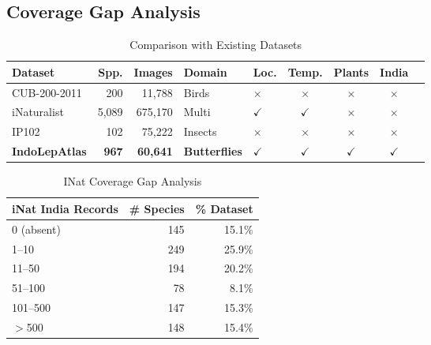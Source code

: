 \documentclass[runningheads]{llncs}
\begin{document}
\subsection{Coverage Gap Analysis}
\begin{table}[H]
\centering
\caption{Comparison with Existing Datasets}
\label{tab:dataset_comparison}
\scriptsize
\begin{tabular}{@{}lrrllcccc@{}}
    \toprule
        \textbf{Dataset} & \textbf{Spp.} & \textbf{Images} & \textbf{Domain} & \textbf{Loc.} & \textbf{Temp.} & \textbf{Plants} & \textbf{India} \\
    \midrule
        CUB-200-2011 & 200 & 11,788 & Birds & $\times$ & $\times$ & $\times$ & $\times$ \\
        iNaturalist & 5,089 & 675,170 & Multi & $\checkmark$ & $\checkmark$ & $\times$ & $\times$ \\
        IP102~\cite{wu2019ip102} & 102 & 75,222 & Insects & $\times$ & $\times$ & $\times$ & $\times$ \\
        \textbf{IndoLepAtlas} & \textbf{967} & \textbf{60,641} & \textbf{Butterflies} & $\checkmark$ & $\checkmark$ & $\checkmark$ & $\checkmark$ \\
    \bottomrule
    \end{tabular}
\end{table}
\begin{table}[H]
\centering
    \caption{INat Coverage Gap Analysis}
    \label{tab:inat_coverage}
    \begin{tabular}{@{}lrr@{}}
        \toprule
        iNat India Records & \# Species & \% Dataset \\
        \midrule
        0 (absent) & 145 & 15.1\% \\
        1–10 & 249 & 25.9\% \\
        11–50 & 194 & 20.2\% \\
        51–100 & 78 & 8.1\% \\
        101–500 & 147 & 15.3\% \\
        $>$500 & 148 & 15.4\% \\
        \bottomrule
    \end{tabular}
\end{table}
\end{document}
